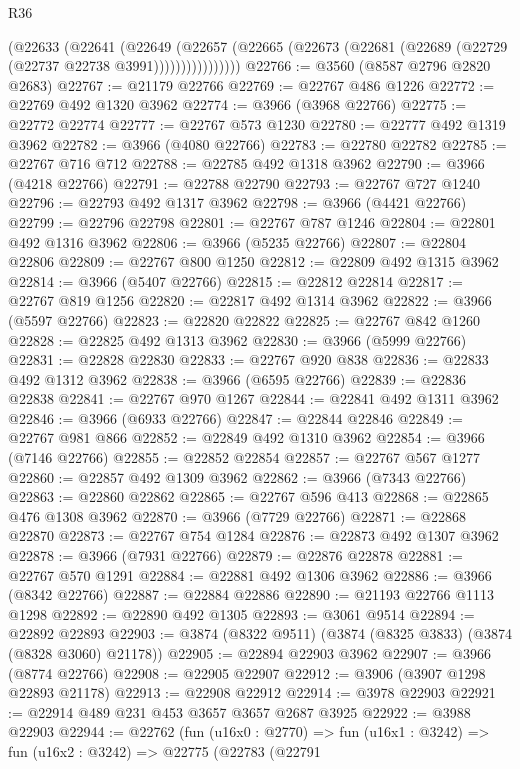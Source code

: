 \begin{lexlean}{R36}
\begin{coremodule}
                (@22633
                  (@22641
                    (@22649
                      (@22657
                        (@22665 (@22673 (@22681 (@22689 (@22729 (@22737 @22738 @3991))))))))))))))))
@22766 := @3560 (@8587 @2796 @2820 @2683)
@22767 := @21179 @22766
@22769 := @22767 @486 @1226
@22772 := @22769 @492 @1320 @3962
@22774 := @3966 (@3968 @22766)
@22775 := @22772 @22774
@22777 := @22767 @573 @1230
@22780 := @22777 @492 @1319 @3962
@22782 := @3966 (@4080 @22766)
@22783 := @22780 @22782
@22785 := @22767 @716 @712
@22788 := @22785 @492 @1318 @3962
@22790 := @3966 (@4218 @22766)
@22791 := @22788 @22790
@22793 := @22767 @727 @1240
@22796 := @22793 @492 @1317 @3962
@22798 := @3966 (@4421 @22766)
@22799 := @22796 @22798
@22801 := @22767 @787 @1246
@22804 := @22801 @492 @1316 @3962
@22806 := @3966 (@5235 @22766)
@22807 := @22804 @22806
@22809 := @22767 @800 @1250
@22812 := @22809 @492 @1315 @3962
@22814 := @3966 (@5407 @22766)
@22815 := @22812 @22814
@22817 := @22767 @819 @1256
@22820 := @22817 @492 @1314 @3962
@22822 := @3966 (@5597 @22766)
@22823 := @22820 @22822
@22825 := @22767 @842 @1260
@22828 := @22825 @492 @1313 @3962
@22830 := @3966 (@5999 @22766)
@22831 := @22828 @22830
@22833 := @22767 @920 @838
@22836 := @22833 @492 @1312 @3962
@22838 := @3966 (@6595 @22766)
@22839 := @22836 @22838
@22841 := @22767 @970 @1267
@22844 := @22841 @492 @1311 @3962
@22846 := @3966 (@6933 @22766)
@22847 := @22844 @22846
@22849 := @22767 @981 @866
@22852 := @22849 @492 @1310 @3962
@22854 := @3966 (@7146 @22766)
@22855 := @22852 @22854
@22857 := @22767 @567 @1277
@22860 := @22857 @492 @1309 @3962
@22862 := @3966 (@7343 @22766)
@22863 := @22860 @22862
@22865 := @22767 @596 @413
@22868 := @22865 @476 @1308 @3962
@22870 := @3966 (@7729 @22766)
@22871 := @22868 @22870
@22873 := @22767 @754 @1284
@22876 := @22873 @492 @1307 @3962
@22878 := @3966 (@7931 @22766)
@22879 := @22876 @22878
@22881 := @22767 @570 @1291
@22884 := @22881 @492 @1306 @3962
@22886 := @3966 (@8342 @22766)
@22887 := @22884 @22886
@22890 := @21193 @22766 @1113 @1298
@22892 := @22890 @492 @1305
@22893 := @3061 @9514
@22894 := @22892 @22893
@22903 := @3874 (@8322 @9511) (@3874 (@8325 @3833) (@3874 (@8328 @3060) @21178))
@22905 := @22894 @22903 @3962
@22907 := @3966 (@8774 @22766)
@22908 := @22905 @22907
@22912 := @3906 (@3907 @1298 @22893 @21178)
@22913 := @22908 @22912
@22914 := @3978 @22903
@22921 := @22914 @489 @231 @453 @3657 @3657 @2687 @3925
@22922 := @3988 @22903
@22944 := @22762
    (fun (u16x0 : @2770) =>
    fun (u16x1 : @3242) =>
    fun (u16x2 : @3242) =>
    @22775
      (@22783
        (@22791

\end{coremodule}
\end{lexlean}
